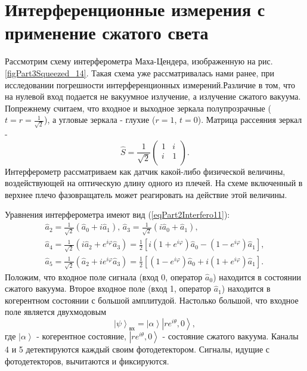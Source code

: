 \section{Интерференционные измерения с применение сжатого света}
Рассмотрим схему интерферометра Маха-Цендера, изображенную на
рис. \ref{figPart3Squeezed_14}.
Такая схема уже рассматривалась нами ранее, при исследовании
погрешности интерференционных измерений.Различие в том, что на нулевой
вход подается не вакуумное излучение, а излучение сжатого вакуума.
Попрежнему считаем, что входное и выходное зеркала полупрозрачные ($t
=r =\frac{1}{\sqrt{2}}$), а угловые зеркала - глухие ($r = 1$, $t =
0$). Матрица рассеяния зеркал - 
\begin{equation}
\hat{S} = \frac{1}{\sqrt{2}}\left(
\begin{array}{cc}
1 & i \\
i & 1 \\
\end{array}
\right).
\nonumber
\end{equation}
Интерферометр рассматриваем как датчик какой-либо физической величины,
воздействующей на оптическую длину одного из плечей. На схеме
включенный в верхнее плечо фазовращатель может реагировать на
действие этой величины.



Уравнения интерферометра имеют вид (\ref{eqPart2Interfero11}):
\begin{eqnarray}
\hat{a}_2 = \frac{1}{\sqrt{2}} \left(\hat{a}_0 + i \hat{a}_1\right),
\,
\hat{a}_3 = \frac{1}{\sqrt{2}} \left(i \hat{a}_0 + \hat{a}_1\right),
\nonumber \\
\hat{a}_4 = \frac{1}{\sqrt{2}} \left(i \hat{a}_2 + e^{i \varphi}
\hat{a}_3\right) = 
\frac{1}{2}\left[
i \left(1 + e^{i \varphi}\right)\hat{a}_0 -
\left(1 - e^{i \varphi}\right)\hat{a}_1
\right],
\nonumber \\
\hat{a}_5 = \frac{1}{\sqrt{2}} \left(\hat{a}_2 + i e^{i \varphi}
\hat{a}_3\right) = 
\frac{1}{2}\left[
\left(1 - e^{i \varphi}\right)\hat{a}_0 +
i \left(1 + e^{i \varphi}\right)\hat{a}_1
\right].
\label{eqPart3SqueezedAddAddAdd2}
\end{eqnarray}
Положим, что входное поле сигнала (вход 0, оператор $\hat{a}_0$)
находится в состоянии сжатого вакуума. Второе входное поле 
(вход 1, оператор $\hat{a}_1$) находится в когерентном состоянии с
большой амплитудой. Настолько большой, что входное поле является
двухмодовым 
\[
\left|\psi\right>_{\mbox{вх}} =
\left|\alpha\right>
\left|re^{i \theta}, 0\right>,
\]
где $\left|\alpha\right>$ - когерентное состояние,
$\left|re^{i \theta}, 0\right>$ - состояние сжатого вакуума. Каналы 4
и 5 детектируются каждый своим фотодетектором. Сигналы, идущие с
фотодетекторов, вычитаются и фиксируются.

